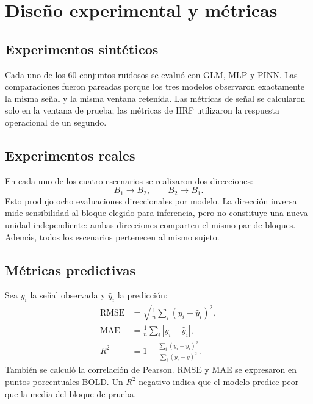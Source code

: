 \chapter{Diseño experimental y métricas}

\section{Experimentos sintéticos}
Cada uno de los 60 conjuntos ruidosos se evaluó con GLM, MLP y PINN. Las comparaciones fueron pareadas porque los tres modelos observaron exactamente la misma señal y la misma ventana retenida. Las métricas de señal se calcularon solo en la ventana de prueba; las métricas de HRF utilizaron la respuesta operacional de un segundo.

\section{Experimentos reales}
En cada uno de los cuatro escenarios se realizaron dos direcciones:
\begin{equation}
B_1\rightarrow B_2,\qquad B_2\rightarrow B_1.
\end{equation}
Esto produjo ocho evaluaciones direccionales por modelo. La dirección inversa mide sensibilidad al bloque elegido para inferencia, pero no constituye una nueva unidad independiente: ambas direcciones comparten el mismo par de bloques. Además, todos los escenarios pertenecen al mismo sujeto.


\section{Métricas predictivas}
Sea $y_i$ la señal observada y $\hat y_i$ la predicción:
\begin{align}
\mathrm{RMSE} &= \sqrt{\frac{1}{n}\sum_i(y_i-\hat y_i)^2},\\
\mathrm{MAE} &= \frac{1}{n}\sum_i|y_i-\hat y_i|,\\
R^2 &= 1-\frac{\sum_i(y_i-\hat y_i)^2}{\sum_i(y_i-\bar y)^2}.
\end{align}
También se calculó la correlación de Pearson. RMSE y MAE se expresaron en puntos porcentuales BOLD. Un $R^2$ negativo indica que el modelo predice peor que la media del bloque de prueba.

